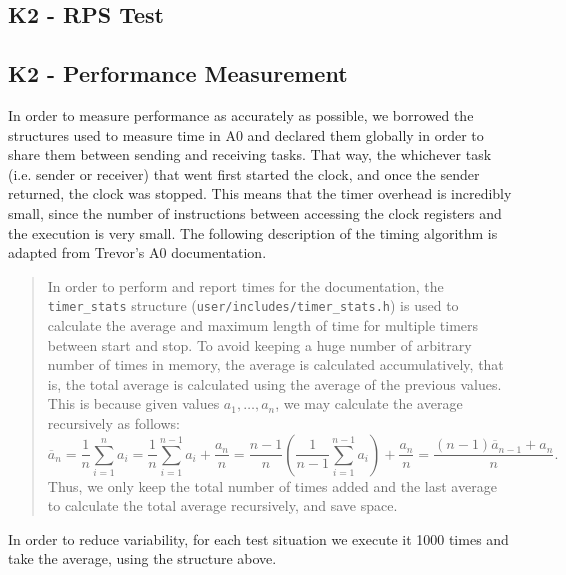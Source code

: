 \documentclass[12pt, titlepage]{article}
\begin{document}
    \subsection{K2 - RPS Test}

    \subsection{K2 - Performance Measurement}

    In order to measure performance as accurately as possible, we borrowed the structures used to measure time in A0 and declared them globally in order to share them between sending and receiving tasks. That way, the whichever task (i.e. sender or receiver) that went first started the clock, and once the sender returned, the clock was stopped. This means that the timer overhead is incredibly small, since the number of instructions between accessing the clock registers and the execution is very small. The following description of the timing algorithm is adapted from Trevor's A0 documentation.

    \begin{quote}
    In order to perform and report times for the documentation, the \verb`timer_stats` structure (\verb`user/includes/timer_stats.h`) is used to calculate the average and maximum length of time for multiple timers between start and stop. To avoid keeping a huge number of arbitrary number of times in memory, the average is calculated accumulatively, that is, the total average is calculated using the average of the previous values. This is because given values $a_1, \ldots, a_n$, we may calculate the average recursively as follows:
    \[
        \overline{a}_n = \frac{1}{n}\sum_{i=1}^n a_i = \frac{1}{n}\sum_{i=1}^{n-1} a_i + \frac{a_n}{n} = \frac{n-1}{n} \left( \frac{1}{n-1} \sum_{i=1}^{n-1} a_i \right) + \frac{a_n}{n} = \frac{(n-1)\overline{a}_{n-1} + a_n}{n}.
    \]
    Thus, we only keep the total number of times added and the last average to calculate the total average recursively, and save space.
    \end{quote}

    In order to reduce variability, for each test situation we execute it 1000 times and take the average, using the structure above.
\end{document}
